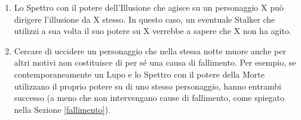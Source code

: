\documentclass[a4paper,10pt]{article}
\begin{document}
\begin{enumerate}
 \item Lo Spettro con il potere dell'Illusione che agisce su un personaggio X può dirigere l'illusione da X stesso. In questo caso, un eventuale Stalker che utilizzi a sua volta il suo potere su X verrebbe a sapere che X non ha agito.
 
 \item Cercare di uccidere un personaggio che nella stessa notte muore anche per altri motivi non costituisce di per sé una causa di fallimento.
 Per esempio, se contemporaneamente un Lupo e lo Spettro con il potere della Morte utilizzano il proprio potere su di uno stesso personaggio, hanno entrambi successo (a meno che non intervengano cause di fallimento, come spiegato nella Sezione \ref{fallimento}).
 
 
\end{enumerate}

\printindex
\end{document}
